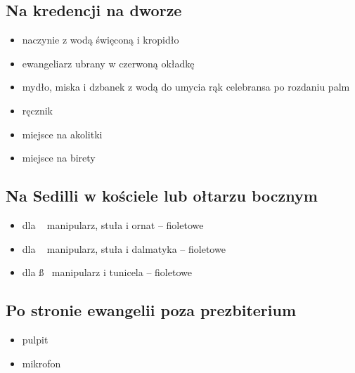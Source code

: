 \subsection{Na kredencji na dworze}
\begin{itemize}
	\item naczynie z wodą święconą i kropidło
	\item ewangeliarz ubrany w {\color{red}czerwoną} okładkę
	\item mydło, miska i dzbanek z wodą do umycia rąk celebransa po rozdaniu
	      palm
	\item ręcznik
	\item miejsce na akolitki
	\item miejsce na birety
\end{itemize}

\subsection{Na Sedilli w kościele lub ołtarzu bocznym}
\begin{itemize}
	\item dla \ii~ manipularz, stuła i ornat – {\color{violet}fioletowe}
	\item dla \dd~ manipularz, stuła i dalmatyka – {\color{violet}fioletowe}
	\item dla \ss~ manipularz i tunicela – {\color{violet}fioletowe}
\end{itemize}

\subsection{Po stronie ewangelii poza prezbiterium}
\begin{itemize}
	\item pulpit
	\item mikrofon
\end{itemize}